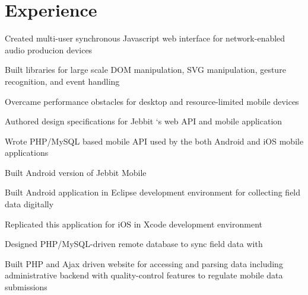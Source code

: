 \documentclass[letterpaper]{deedy-resume} %
\begin{document}
%
\begin{minipage}[t]{0.66\textwidth} %


\section{Experience}


\vspace{\topsep} %
\begin{tightitemize}
\item Created multi-user synchronous Javascript web interface for network-enabled audio producion devices
\item Built libraries for large scale DOM manipulation, SVG manipulation, gesture recognition, and event handling
\item Overcame performance obstacles for desktop and resource-limited mobile devices
\end{tightitemize}

\sectionspace %



\begin{tightitemize}
\item Authored design specifications for Jebbit ‘s web API and mobile application
\item Wrote PHP/MySQL based mobile API used by the both Android and iOS mobile applications
\item Built Android version of Jebbit Mobile
\end{tightitemize}

\sectionspace %



\begin{tightitemize}
\item Built Android application in Eclipse development environment for collecting field data digitally
\item Replicated this application for iOS in Xcode development environment
\item Designed PHP/MySQL-driven remote database to sync field data with
\item Built PHP and Ajax driven website for accessing and parsing data including administrative backend with quality-control features to regulate mobile data submissions


\end{tightitemize}
\end{minipage}
\end{document}
